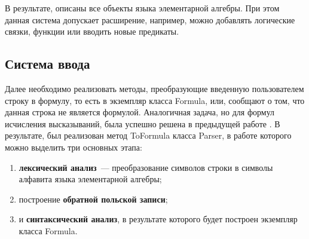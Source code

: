 В результате, описаны все объекты языка элементарной алгебры. При этом данная система допускает расширение, например, можно добавлять логические связки, функции или вводить новые предикаты.

\subsection{Система ввода}

Далее необходимо реализовать методы, преобразующие введенную пользователем строку в формулу, то есть в экземпляр класса Formula, или, сообщают о том, что данная строка не является формулой. Аналогичная задача, но для формул исчисления высказываний, была успешно решена в предыдущей работе \cite{Gibadulin1}. В результате, был реализован метод ToFormula класса Parser, в работе которого можно выделить три основных этапа:
\begin{enumerate}
    \item \textbf{лексический анализ}~--- преобразование символов строки в символы алфавита языка элементарной алгебры;
    \item построение \textbf{обратной польской записи};
    \item и \textbf{синтаксический анализ}, в результате которого будет построен экземпляр класса Formula.
\end{enumerate}

